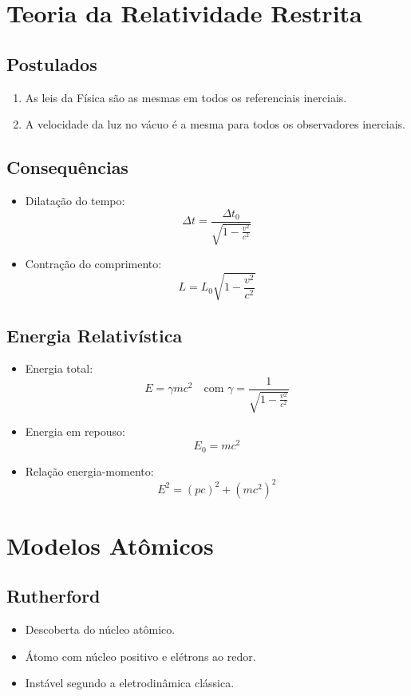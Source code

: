 \documentclass[a4paper,12pt]{article}
\begin{document}
\begin{multicols}{2}
\section{Teoria da Relatividade Restrita}
\subsection{Postulados}
\begin{enumerate}
    \item As leis da Física são as mesmas em todos os referenciais inerciais.
    \item A velocidade da luz no vácuo é a mesma para todos os observadores inerciais.
\end{enumerate}

\subsection{Consequências}
\begin{itemize}
    \item Dilatação do tempo:
    \[
        \Delta t = \frac{\Delta t_0}{\sqrt{1 - \frac{v^2}{c^2}}}
    \]
    \item Contração do comprimento:
    \[
        L = L_0 \sqrt{1 - \frac{v^2}{c^2}}
    \]
\end{itemize}

\subsection{Energia Relativística}
\begin{itemize}
    \item Energia total:
    \[
        E = \gamma m c^2
    \quad \text{com } \gamma = \frac{1}{\sqrt{1 - \frac{v^2}{c^2}}}
    \]
    \item Energia em repouso:
    \[
        E_0 = m c^2
    \]
    \item Relação energia-momento:
    \[
        E^2 = (pc)^2 + (m c^2)^2
    \]
\end{itemize}

\section{Modelos Atômicos}
\subsection{Rutherford}
\begin{itemize}
    \item Descoberta do núcleo atômico.
    \item Átomo com núcleo positivo e elétrons ao redor.
    \item Instável segundo a eletrodinâmica clássica.
\end{itemize}


\end{multicols}
\end{document}
